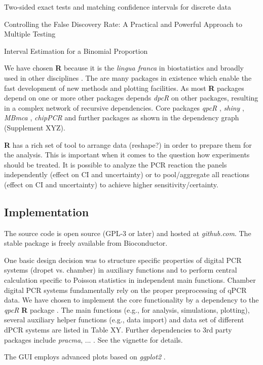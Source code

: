 \documentclass{bioinfo}
\begin{document}
Two-sided exact tests and matching confidence intervals for discrete data \cite{fay_2010}

Controlling the False Discovery Rate: A Practical and Powerful Approach to Multiple Testing \cite{benjamini_1995}

Interval Estimation for a Binomial Proportion \cite{brown_2001}



We have chosen \textbf{R} because it is the \textit{lingua franca} in 
biostatistics and broadly used in other disciplines \cite{rodiger_r_2015}. The 
are many packages in existence which enable the fast development of new methods 
and plotting facilities. As most \textbf{R} packages depend on one or more other 
packages \cite{ooms_2013} depends \textit{dpcR} on other packages, resulting in 
a complex network of recursive dependencies. Core packages \textit{qpcR} 
\cite{ritz_qpcr_2008}, \textit{shiny} \cite{shiny}, \textit{MBmca} 
\cite{rodiger_surface_2013}, \textit{chipPCR} \cite{rodiger_chippcr_2015} and 
further packages as shown in the dependency graph (Supplement XYZ).

 

\textbf{R} has a rich set of tool to arrange data (reshape?) in order to prepare them for 
the analysis. This is important when it comes to the question how experiments 
should be treated. It is possible to analyze the PCR reaction the panels 
independently (effect on CI and uncertainty) or to pool/aggregate all reactions 
(effect on CI and uncertainty) to achieve higher sensitivity/certainty.


\begin{methods}
\section{Implementation}

The source code is open source (GPL-3 or later) and hosted at \textit{github.com}. The stable package is freely 
available from Bioconductor.

One basic design decision was to structure specific properties of digital PCR 
systems (dropet vs. chamber) in auxiliary functions and to perform central 
calculation specific to Poisson statistics in independent main functions. 
Chamber digital PCR systems fundamentally rely on the proper preprocessing of 
qPCR data. We have chosen to implement the core functionality by a dependency to 
the \textit{qpcR} \textbf{R} package \cite{ritz_qpcr_2008}. The main functions (e.g., for analysis, 
simulations, plotting), several auxiliary helper functions (e.g., data import) 
and data set of different dPCR systems are listed in Table XY. Further 
dependencies to 3rd party packages include \textit{pracma}, ... . See the vignette for 
details.

The GUI employs advanced plots based on \textit{ggplot2} \cite{kahle_wickham_2013}.



\end{methods}
\end{document}
